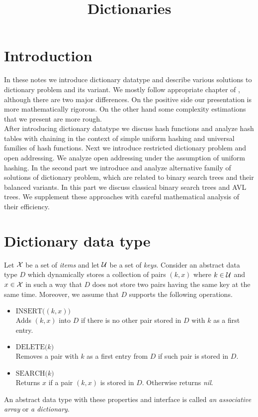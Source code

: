 


\title{Dictionaries}
\date{}
\maketitle

\section{Introduction}
\noindent
In these notes we introduce dictionary datatype and describe various solutions to dictionary problem and its variant. We mostly follow appropriate chapter of \cite{CormenLeisersonRivestStein}, although there are two major differences. On the positive side our presentation is more mathematically rigorous. On the other hand some complexity estimations that we present are more rough.\\
After introducing dictionary datatype we discuss hash functions and analyze hash tables with chaining in the context of simple uniform hashing and universal families of hash functions. Next we introduce restricted dictionary problem and open addressing. We analyze open addressing under the assumption of uniform hashing. In the second part we introduce and analyze alternative family of solutions of dictionary problem, which are related to binary search trees and their balanced variants. In this part we discuss classical binary search trees and AVL trees. We supplement these approaches with careful mathematical analysis of their efficiency.  

\section{Dictionary data type}

\begin{definition}
Let ${\mathcal X}$ be a set of \textit{items} and let ${\mathcal U}$ be a set of \textit{keys}. Consider an abstract data type $D$ which dynamically stores a collection of pairs $(k, x)$ where $k\in {\mathcal U}$ and $x\in {\mathcal X}$ in such a way that $D$ does not store two pairs having the same key at the same time. Moreover, we assume that $D$ supports the following operations.
\begin{itemize}
\item[] $\textrm{INSERT}\big((k,x)\big)$\\
Adds $(k,x)$ into $D$ if there is no other pair stored in $D$ with $k$ as a first entry.
\item[] $\textrm{DELETE}\big(k\big)$\\
Removes a pair with $k$ as a first entry from $D$ if such pair is stored in $D$.
\item[] $\textrm{SEARCH}\big(k\big)$\\
Returns $x$ if a pair $(k,x)$ is stored in $D$. Otherwise returns \textit{nil}. 
\end{itemize}
An abstract data type with these properties and interface is called \textit{an associative array} or \textit{a dictionary}.
\end{definition}


